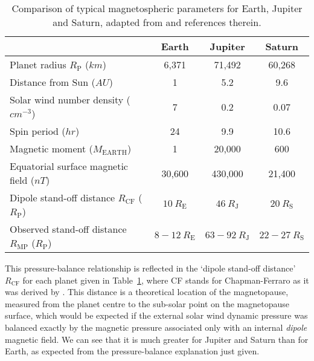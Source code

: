 \begin{table}
\caption[Comparison of typical magnetospheric parameters for Earth, Jupiter and Saturn.]{Comparison of typical magnetospheric parameters for Earth, Jupiter and Saturn, adapted from \citet{bagenal2014} and references therein.}\label{intro:table:magnetospherecomparison}
\centering
\begin{tabular}{l c c c}
\hline
 																															& Earth						& Jupiter			& Saturn  \\
\hline
Planet radius $R_\mathrm{P}$ ($\si{km}$)															& 6,371					&	71,492			&	60,268 \\
Distance from Sun ($\si{AU}$)																			&	1							&	5.2				& 9.6		\\
Solar wind number density ($\si{cm^{-3}}$)														& 7							&	0.2				&	0.07		\\
Spin period ($\si{hr}$)																						&	24						& 	9.9				&10.6		\\
Magnetic moment ($\si{M_\mathrm{EARTH}}$)													&	1							&	20,000			&	600		\\
Equatorial surface magnetic field ($\si{nT}$)														&	30,600					&	430,000		&	21,400	\\
Dipole stand-off distance $R_\mathrm{CF}$	($\si{R_\mathrm{P}}$) 				&	$\SI{10}{R_\mathrm{E}}$ & $\SI{46}{R_\mathrm{J}}$ & $\SI{20}{R_\mathrm{S}}$ \\
Observed stand-off distance $R_\mathrm{MP}$ ($\si{R_\mathrm{P}}$)			&	$8-\SI{12}{R_\mathrm{E}}$ & $63-\SI{92}{R_\mathrm{J}}$ & $22-\SI{27}{R_\mathrm{S}}$ \\
\hline
\end{tabular}
\end{table}

This pressure-balance relationship is reflected in the `dipole stand-off distance' $R_\mathrm{CF}$ for each planet given in Table~\ref{intro:table:magnetospherecomparison}, where CF stands for Chapman-Ferraro as it was derived by \citet{chapman1930}. This distance is a theoretical location of the magnetopause, measured from the planet centre to the sub-solar point on the magnetopause surface, which would be expected if the external solar wind dynamic pressure was balanced exactly by the magnetic pressure associated only with an internal \textit{dipole} magnetic field. We can see that it is much greater for Jupiter and Saturn than for Earth, as expected from the pressure-balance explanation just given.


